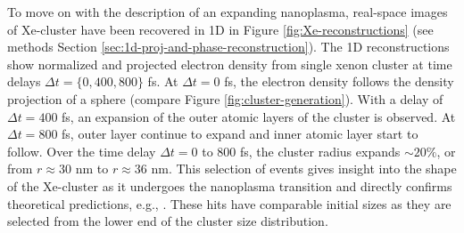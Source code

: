 To move on with the description of an expanding nanoplasma, real-space images of Xe-cluster have been recovered in 1D in Figure \ref{fig:Xe-reconstructions} (see methods Section \ref{sec:1d-proj-and-phase-reconstruction}). The 1D reconstructions show normalized and projected electron density from single xenon cluster at time delays $\Delta t=\{0, 400, 800\}$ fs. At $\Delta t = 0$ fs, the electron density follows the density projection of a sphere (compare Figure \ref{fig:cluster-generation}). With a delay of $\Delta t = 400$ fs, an expansion of the outer atomic layers of the cluster is observed. At $\Delta t = 800$ fs, outer layer continue to expand and inner atomic layer start to follow. Over the time delay $\Delta t=0$ to $800$ fs, the cluster radius expands $\sim 20\%$, or from $r\approx 30$ nm to $r\approx 36$ nm. This selection of events gives insight into the shape of the Xe-cluster as it undergoes the nanoplasma transition and directly confirms theoretical predictions, e.g., \citep{Hau-Riege-2004-PRE}. These hits have comparable initial sizes as they are selected from the lower end of the cluster size distribution.\\

